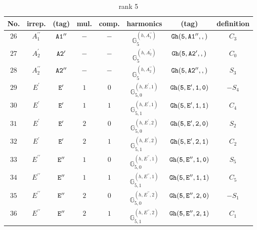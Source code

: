 \documentclass[fleqn,8pt]{jsarticle}
\begin{document}
\begin{table}[ht!]
\begin{center}
\caption{rank 5}
\renewcommand{\arraystretch}{1.3}
\begin{tabular}{cccccccc} \hline \hline
No. & irrep. & (tag) & mul. & comp. & harmonics & (tag) & definition \\ \hline
$ 26 $ & $ A_{1}^{\prime\prime} $ & $ {\tt A1''} $ & $ - $ & $ - $ & $ \mathbb{G}_{5}^{(h,A_{1}^{\prime\prime})} $ & $ {\tt Gh(5,A1'',,)} $ & $ C_{3} $ \\
$ 27 $ & $ A_{2}^{\prime} $ & $ {\tt A2'} $ & $ - $ & $ - $ & $ \mathbb{G}_{5}^{(h,A_{2}^{\prime})} $ & $ {\tt Gh(5,A2',,)} $ & $ C_{0} $ \\
$ 28 $ & $ A_{2}^{\prime\prime} $ & $ {\tt A2''} $ & $ - $ & $ - $ & $ \mathbb{G}_{5}^{(h,A_{2}^{\prime\prime})} $ & $ {\tt Gh(5,A2'',,)} $ & $ S_{3} $ \\
$ 29 $ & $ E^{\prime} $ & $ {\tt E'} $ & $ 1 $ & $ 0 $ & $ \mathbb{G}_{5,0}^{(h,E^{\prime},1)} $ & $ {\tt Gh(5,E',1,0)} $ & $ - S_{4} $ \\
$ 30 $ & $ E^{\prime} $ & $ {\tt E'} $ & $ 1 $ & $ 1 $ & $ \mathbb{G}_{5,1}^{(h,E^{\prime},1)} $ & $ {\tt Gh(5,E',1,1)} $ & $ C_{4} $ \\
$ 31 $ & $ E^{\prime} $ & $ {\tt E'} $ & $ 2 $ & $ 0 $ & $ \mathbb{G}_{5,0}^{(h,E^{\prime},2)} $ & $ {\tt Gh(5,E',2,0)} $ & $ S_{2} $ \\
$ 32 $ & $ E^{\prime} $ & $ {\tt E'} $ & $ 2 $ & $ 1 $ & $ \mathbb{G}_{5,1}^{(h,E^{\prime},2)} $ & $ {\tt Gh(5,E',2,1)} $ & $ C_{2} $ \\
$ 33 $ & $ E^{\prime\prime} $ & $ {\tt E''} $ & $ 1 $ & $ 0 $ & $ \mathbb{G}_{5,0}^{(h,E^{\prime\prime},1)} $ & $ {\tt Gh(5,E'',1,0)} $ & $ S_{5} $ \\
$ 34 $ & $ E^{\prime\prime} $ & $ {\tt E''} $ & $ 1 $ & $ 1 $ & $ \mathbb{G}_{5,1}^{(h,E^{\prime\prime},1)} $ & $ {\tt Gh(5,E'',1,1)} $ & $ C_{5} $ \\
$ 35 $ & $ E^{\prime\prime} $ & $ {\tt E''} $ & $ 2 $ & $ 0 $ & $ \mathbb{G}_{5,0}^{(h,E^{\prime\prime},2)} $ & $ {\tt Gh(5,E'',2,0)} $ & $ - S_{1} $ \\
$ 36 $ & $ E^{\prime\prime} $ & $ {\tt E''} $ & $ 2 $ & $ 1 $ & $ \mathbb{G}_{5,1}^{(h,E^{\prime\prime},2)} $ & $ {\tt Gh(5,E'',2,1)} $ & $ C_{1} $ \\
 \hline \hline
\end{tabular}
\end{center}
\end{table}
\end{document}
